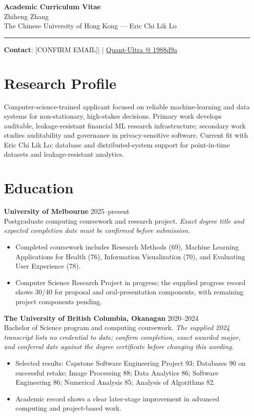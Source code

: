 \documentclass[11pt]{article}
\makeatletter
\newcommand{\ApplicantName}{Zhiheng Zhang}
\newcommand{\ApplicantEmail}{[CONFIRM EMAIL]}
\newcommand{\ApplicantPhone}{[CONFIRM PHONE]}
\newcommand{\ApplicantGitHub}{\href{https://github.com/zhiheng-zhang-Mera/Quant-Ultra/tree/1988d9a8530da91a8158de864d098ea869098923}{Quant-Ultra @ 1988d9a}}
\makeatother
\begin{document}
\begin{center}
{\LARGE\bfseries Academic Curriculum Vitae}\\[0.25em]
{\large \ApplicantName}\\
The Chinese University of Hong Kong --- Eric Chi Lik Lo
\end{center}
\vspace{0.35em}\hrule\vspace{0.65em}

\textbf{Contact}: \ApplicantEmail\quad | \quad \ApplicantPhone\quad | \quad \ApplicantGitHub

\section*{Research Profile}
Computer-science-trained applicant focused on reliable machine-learning and data systems for non-stationary, high-stakes decisions. Primary work develops auditable, leakage-resistant financial ML research infrastructure; secondary work studies auditability and governance in privacy-sensitive software. Current fit with Eric Chi Lik Lo: database and distributed-system support for point-in-time datasets and leakage-resistant analytics.

\section*{Education}
\textbf{University of Melbourne} \hfill 2025--present\\
Postgraduate computing coursework and research project. \textit{Exact degree title and expected completion date must be confirmed before submission.}
\begin{itemize}
\item Completed coursework includes Research Methods (69), Machine Learning Applications for Health (76), Information Visualization (70), and Evaluating User Experience (78).
\item Computer Science Research Project in progress; the supplied progress record shows 30/40 for proposal and oral-presentation components, with remaining project components pending.
\end{itemize}

\textbf{The University of British Columbia, Okanagan} \hfill 2020--2024\\
Bachelor of Science program and computing coursework. \textit{The supplied 2024 transcript lists no credential to date; confirm completion, exact awarded major, and conferral date against the degree certificate before changing this wording.}
\begin{itemize}
\item Selected results: Capstone Software Engineering Project 93; Databases 90 on successful retake; Image Processing 88; Data Analytics 86; Software Engineering 86; Numerical Analysis 85; Analysis of Algorithms 82.
\item Academic record shows a clear later-stage improvement in advanced computing and project-based work.
\end{itemize}
\end{document}
